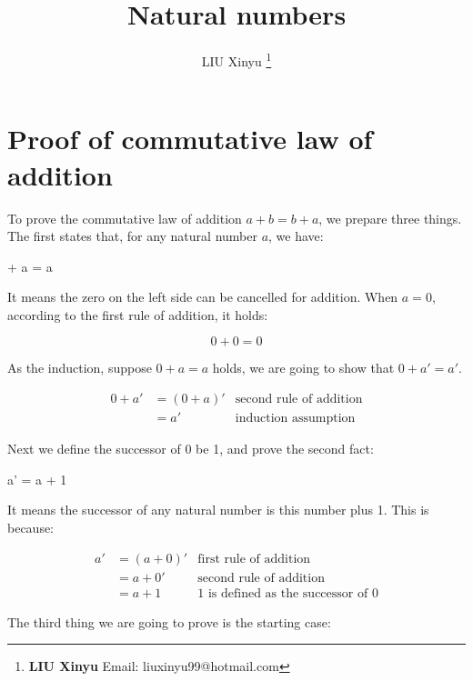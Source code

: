 \documentclass[UTF8]{article}
\begin{document}
\title{Natural numbers}

\author{LIU Xinyu
\thanks{{\bfseries LIU Xinyu} \newline
  Email: liuxinyu99@hotmail.com \newline}
  }

\maketitle
\fi


\chapter*{Proof of commutative law of addition}

To prove the commutative law of addition $a + b = b + a$, we prepare three things. The first states that, for any natural number $a$, we have:

 + a = a
\label{eq:left-zero}
\ee

It means the zero on the left side can be cancelled for addition. When $a = 0$, according to the first rule of addition, it holds:

\[
0 + 0 = 0
\]

As the induction, suppose $0 + a = a$ holds, we are going to show that $0 + a' = a'$.

\[
\begin{array}{rlr}
0 + a' & = (0 + a)' & \text{second rule of addition} \\
       & = a' & \text{induction assumption}
\end{array}
\]

Next we define the successor of 0 be 1, and prove the second fact:

\be
a' = a + 1
\label{eq:one-succ}
\ee

It means the successor of any natural number is this number plus 1. This is because:

\[
\begin{array}{rlr}
a' & = (a + 0)' & \text{first rule of addition} \\
   & = a + 0' & \text{second rule of addition} \\
   & = a + 1 & \text{1 is defined as the successor of 0}
\end{array}
\]

The third thing we are going to prove is the starting case:
\end{document}

